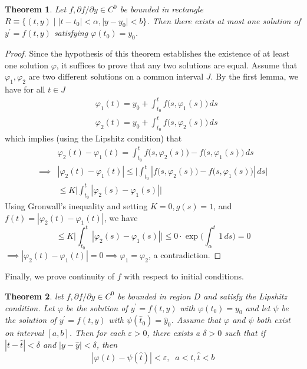 \documentclass{article}
\newtheorem{theorem}{Theorem}[section]
\theoremstyle{remark}
\theoremstyle{definition}
\begin{document}
\begin{theorem}
Let $f, \partial f/ \partial y \in C^0$ be bounded in rectangle $R \equiv \{(t, y) \;|\; |t-t_0| < \alpha, |y - y_0| < b\}$. Then there exists at most one solution of $y^\prime = f(t, y)$ satisfying $\varphi(t_0) = y_0$. 
\end{theorem}
\begin{proof}
Since the hypothesis of this theorem establishes the existence of at least one solution $\varphi$, it suffices to prove that any two solutions are equal. Assume that $\varphi_1, \varphi_2$ are two different solutions on a common interval $J$. By the first lemma, we have for all $t \in J$
\begin{align*}
    &\varphi_1 (t) = y_0 + \int_{t_0}^t f\big(s, \varphi_1 (s)\big) \,ds \\
    &\varphi_2 (t) = y_0 + \int_{t_0}^t f\big(s, \varphi_2 (s)\big) \,ds
\end{align*}
which implies (using the Lipshitz condition) that
\begin{align*}
    & \varphi_2 (t) - \varphi_1 (t) = \int_{t_0}^t f\big(s, \varphi_2 (s)\big) - f\big(s, \varphi_1 (s)\big) \, ds \\
    \implies & |\varphi_2 (t) - \varphi_1 (t)| \leq \bigg|\int_{t_0}^t |f\big(s, \varphi_2 (s)\big) - f\big(s, \varphi_1 (s)\big)| \, ds\bigg| \\
    & \leq K \bigg| \int_{t_0}^t |\varphi_2 (s) - \varphi_1 (s) | \bigg|
\end{align*}
Using Gronwall's inequality and setting $K=0, g(s) = 1$, and $f(t) = |\varphi_2 (t) - \varphi_1 (t)|$, we have
\[\leq K \bigg| \int_{t_0}^t |\varphi_2 (s) - \varphi_1 (s) | \bigg| \leq 0 \cdot \exp \bigg( \int_{\alpha}^t 1\,ds \bigg) = 0\]
$\implies |\varphi_2 (t) - \varphi_1 (t)| = 0 \implies \varphi_1 = \varphi_2$, a contradiction. 
\end{proof}

Finally, we prove continuity of $f$ with respect to initial conditions. 
\begin{theorem}
let $f, \partial f/ \partial y \in C^0$ be bounded in region $D$ and satisfy the Lipshitz condition. Let $\varphi$ be the solution of $y^\prime = f(t, y)$ with $\varphi(t_0) = y_0$ and let $\psi$ be the solution of $y^\prime = f(t, y)$ with $\psi(\hat{t}_0) = \hat{y}_0$. Assume that $\varphi$ and $\psi$ both exist on interval $[a, b]$. Then for each $\varepsilon > 0$, there exists a $\delta > 0$ such that if $|t - \hat{t}| < \delta$ and $|y - \hat{y}| < \delta$, then 
\[|\varphi(t) - \psi(\hat{t})| < \varepsilon, \;\; a < t, \hat{t} < b\]
\end{theorem}
\end{document}
